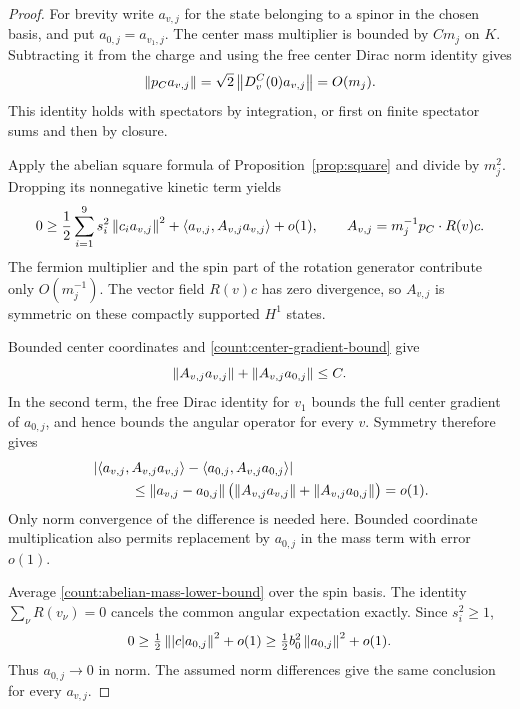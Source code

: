 \begin{proof}
For brevity write \(a_{v,j}\) for the state belonging to a spinor in the
chosen basis, and put \(a_{0,j}=a_{v_1,j}\). The center mass multiplier
is bounded by \(Cm_j\) on \(K\). Subtracting it from the charge and using
the free center Dirac norm identity gives
\begin{equation}\label{count:center-gradient-bound}
 \left\lVert p_Ca_{v,j}\right\rVert=\sqrt2\left\lVert D_v^C(0)a_{v,j}\right\rVert=O(m_j).
\end{equation}
This identity holds with spectators by integration, or first on finite
spectator sums and then by closure.

Apply the abelian square formula of Proposition~\ref{prop:square} and
divide by \(m_j^2\). Dropping its nonnegative kinetic term yields
\begin{equation}\label{count:abelian-mass-lower-bound}
 0\ge \frac12\sum_{i=1}^9s_i^2\left\lVert c_i a_{v,j}\right\rVert^2
       +\left\langle a_{v,j},A_{v,j}a_{v,j}\right\rangle+o(1),
 \qquad A_{v,j}=m_j^{-1}p_C\cdot R(v)c.
\end{equation}
The fermion multiplier and the spin part of the rotation generator
contribute only \(O(m_j^{-1})\). The vector field \(R(v)c\) has zero
divergence, so \(A_{v,j}\) is symmetric on these compactly supported
\(H^1\) states.

Bounded center coordinates and \eqref{count:center-gradient-bound} give
\[
 \left\lVert A_{v,j}a_{v,j}\right\rVert+\left\lVert A_{v,j}a_{0,j}\right\rVert\le C.
\]
In the second term, the free Dirac identity for \(v_1\) bounds the full
center gradient of \(a_{0,j}\), and hence bounds the angular operator
for every \(v\). Symmetry therefore gives
\begin{equation}\label{count:angular-replacement}
 \begin{split}
 &\left|\left\langle a_{v,j},A_{v,j}a_{v,j}\right\rangle
              -\left\langle a_{0,j},A_{v,j}a_{0,j}\right\rangle\right|\\
 &\hspace{1cm}\le\left\lVert a_{v,j}-a_{0,j}\right\rVert
       \bigl(\left\lVert A_{v,j}a_{v,j}\right\rVert+\left\lVert A_{v,j}a_{0,j}\right\rVert\bigr)=o(1).
 \end{split}
\end{equation}
Only norm convergence of the difference is needed here. Bounded
coordinate multiplication also permits replacement by \(a_{0,j}\) in
the mass term with error \(o(1)\).

Average \eqref{count:abelian-mass-lower-bound} over the spin basis.
The identity \(\sum_\nu R(v_\nu)=0\) cancels the common angular
expectation exactly. Since \(s_i^2\ge1\),
\[
 0\ge\tfrac12\left\lVert |c|a_{0,j}\right\rVert^2+o(1)
   \ge\tfrac12b_0^2\left\lVert a_{0,j}\right\rVert^2+o(1).
\]
Thus \(a_{0,j}\to0\) in norm. The assumed norm differences give the
same conclusion for every \(a_{v,j}\).
\end{proof}

